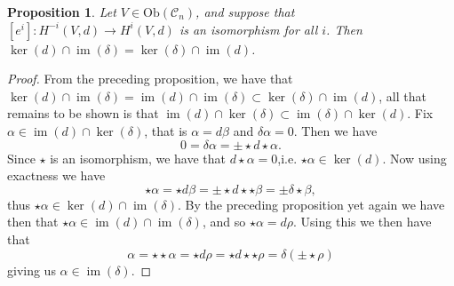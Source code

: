 \documentclass{amsart}
\newcommand{\ra}{\rightarrow}
\newtheorem{prop}[theorem]{Proposition}
\theoremstyle{definition}
\DeclareMathOperator{\im}{im}
\begin{document}
\begin{prop}\label{KIisIK} 
  Let $V \in \mathrm{Ob}(\mathscr{C}_n)$, and suppose that $[e^i]:H^{-i}(V,d) \ra H^i(V,d)$ is an isomorphism for all $i$. Then
    $\ker(d) \cap \im (\delta) = \ker(\delta) \cap \im(d)$.
\end{prop}
\begin{proof}
 From the preceding proposition, we have that $\ker(d) \cap \im(\delta)=\im(d) \cap \im(\delta) \subset \ker(\delta) \cap \im(d)$, all that remains to be shown is that $\im(d) \cap \ker( \delta) \subset \im(\delta) \cap \ker(d)$. Fix $\alpha \in \im(d) \cap \ker(\delta)$, that is $\alpha = d\beta$ and $\delta \alpha=0$. Then we have 
 \begin{equation*}
     0 = \delta \alpha = \pm \star d \star \alpha.
 \end{equation*}
 Since $\star$ is an isomorphism, we have that $d \star \alpha =0$,i.e. $\star \alpha \in \ker(d)$. Now using exactness we have
 \begin{equation*}
     \star \alpha = \star d \beta = \pm \star d \star \star \beta = \pm \delta \star \beta,
 \end{equation*}
 thus $\star \alpha \in \ker(d) \cap \im(\delta)$. By the preceding proposition yet again we have then that $\star \alpha \in \im(d) \cap \im (\delta)$, and so $\star \alpha = d \rho$. Using this we then have that
 \begin{equation*}
     \alpha = \star \star \alpha = \star d \rho = \star d \star \star \rho  =\delta (\pm \star \rho)
 \end{equation*}
 giving us $\alpha \in \im (\delta)$.
\end{proof}
\end{document}
